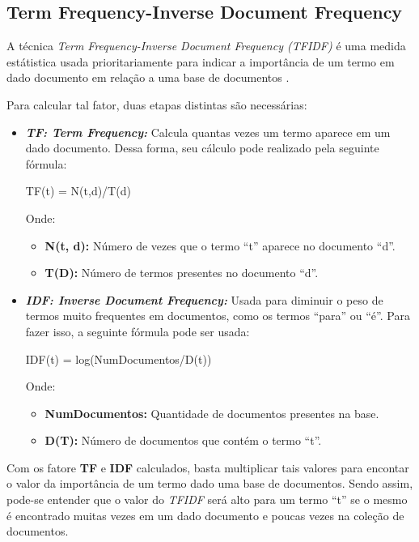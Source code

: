 \begin{anexosenv}

\partanexos

\chapter{Term Frequency-Inverse Document Frequency}

A técnica \textit{Term Frequency-Inverse Document Frequency (TFIDF)} é uma
medida estátistica usada prioritariamente para indicar a importância de um termo
em dado documento em relação a uma base de documentos \cite{1_rajaraman_ullman_2011}.

Para calcular tal fator, duas etapas distintas são necessárias:

\begin{itemize}
    \item \textbf{\textit{TF: Term Frequency: }} Calcula quantas vezes um termo
    aparece em um dado documento. Dessa forma, seu cálculo pode realizado pela
    seguinte fórmula:

    TF(t) = N(t,d)/T(d)

    Onde:
    \begin{itemize}
        \item \textbf{N(t, d): } Número de vezes que o termo ``t'' aparece no
        documento ``d''.
        \item \textbf{T(D): } Número de termos presentes no documento ``d''.
    \end{itemize}

    \item \textbf{\textit{IDF: Inverse Document Frequency: }} Usada para diminuir o
    peso de termos muito frequentes em documentos, como os termos ``para'' ou
    ``é''. Para fazer isso, a seguinte fórmula pode ser usada:

    IDF(t) = log(NumDocumentos/D(t))

    Onde:
    \begin{itemize}
        \item \textbf{NumDocumentos: } Quantidade de documentos presentes na
        base.
        \item \textbf{D(T): } Número de documentos que contém o termo ``t''.
    \end{itemize}
\end{itemize}

Com os fatore \textbf{TF} e \textbf{IDF} calculados, basta multiplicar tais
valores para encontar o valor da importância de um termo dado uma base de
documentos. Sendo assim, pode-se entender que o valor do \textit{TFIDF} será
alto para um termo ``t'' se o mesmo é encontrado muitas vezes em um dado
documento e poucas vezes na coleção de documentos.


\end{anexosenv}
